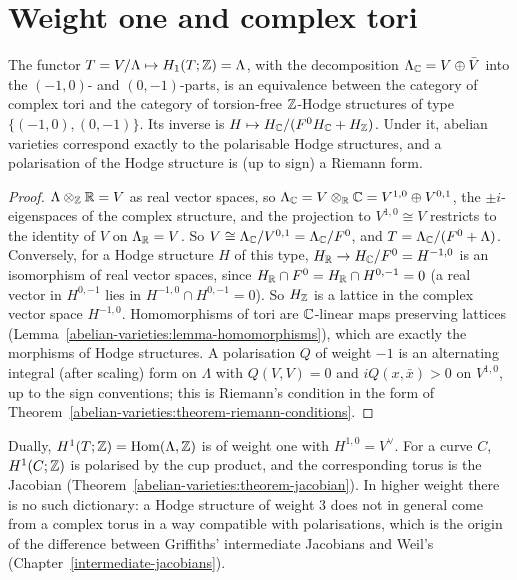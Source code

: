 \section{Weight one and complex tori}\label{hodge-structures:section-weight-one}

\begin{theorem}\label{hodge-structures:theorem-weight-one}
The functor $T = V/\Lambda \mapsto H_1(T; \mathbb{Z}) = \Lambda$, with the decomposition $\Lambda_{\mathbb{C}} = V \oplus \bar V$ into the $(-1,0)$- and $(0,-1)$-parts, is an equivalence between the category
of complex tori and the category of torsion-free $\mathbb{Z}$-Hodge structures of type $\{(-1,0), (0,-1)\}$. Its inverse is $H \mapsto H_{\mathbb{C}}/(F^0H_{\mathbb{C}} + H_{\mathbb{Z}})$. Under it, abelian varieties
correspond exactly to the polarisable Hodge structures, and a polarisation of the Hodge structure is (up to sign) a Riemann form.
\end{theorem}

\begin{proof}
$\Lambda \otimes_{\mathbb{Z}}\mathbb{R} = V$ as real vector spaces, so $\Lambda_{\mathbb{C}} = V \otimes_{\mathbb{R}}\mathbb{C} = V^{1,0} \oplus V^{0,1}$, the $\pm i$-eigenspaces of the complex structure, and the projection to $V^{1,0} \cong V$
restricts to the identity of $V$ on $\Lambda_{\mathbb{R}} = V$. So $V \cong \Lambda_{\mathbb{C}}/V^{0,1} = \Lambda_{\mathbb{C}}/F^0$, and $T = \Lambda_{\mathbb{C}}/(F^0 + \Lambda)$. Conversely, for a Hodge structure $H$ of this type,
$H_{\mathbb{R}} \to H_{\mathbb{C}}/F^0 = H^{-1,0}$ is an isomorphism of real vector spaces, since $H_{\mathbb{R}} \cap F^0 = H_{\mathbb{R}} \cap H^{0,-1} = 0$ (a real vector in $H^{0,-1}$ lies in $H^{-1,0} \cap H^{0,-1} = 0$). So $H_{\mathbb{Z}}$
is a lattice in the complex vector space $H^{-1,0}$. Homomorphisms of tori are $\mathbb{C}$-linear maps preserving lattices (Lemma~\ref{abelian-varieties:lemma-homomorphisms}), which are exactly
the morphisms of Hodge structures. A polarisation $Q$ of weight $-1$ is an alternating integral (after scaling) form on $\Lambda$ with $Q(V, V) = 0$ and $iQ(x, \bar x) > 0$ on $V^{1,0}$, up to the
sign conventions; this is Riemann's condition in the form of Theorem~\ref{abelian-varieties:theorem-riemann-conditions}.
\end{proof}

\begin{remark}\label{hodge-structures:remark-weight-one-cohomology}
Dually, $H^1(T; \mathbb{Z}) = \operatorname{Hom}(\Lambda, \mathbb{Z})$ is of weight one with $H^{1,0} = V^\vee$. For a curve $C$, $H^1(C; \mathbb{Z})$ is polarised by the cup product, and the corresponding torus is the Jacobian
(Theorem~\ref{abelian-varieties:theorem-jacobian}). In higher weight there is no such dictionary: a Hodge structure of weight $3$ does not in general come from a complex torus in a way compatible
with polarisations, which is the origin of the difference between Griffiths' intermediate Jacobians and Weil's (Chapter~\ref{intermediate-jacobians}).
\end{remark}

